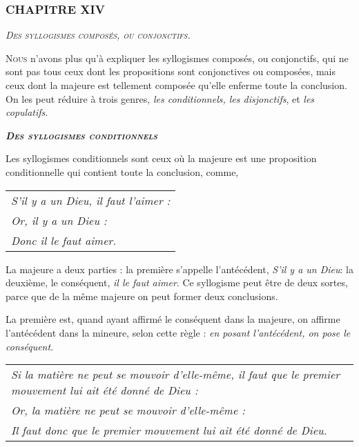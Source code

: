 \subsubsection{\centering \Large CHAPITRE XIV}
\begin{center}\emph{\large\scshape Des syllogismes composés, ou conjonctifs.}\end{center}

	\lettrine{N}{ous} n'avons plus qu'à expliquer les syllogismes composés, ou conjonctifs, qui ne sont pas tous ceux dont les propositions sont conjonctives ou composées, mais ceux dont la majeure est tellement composée qu'elle enferme toute la conclusion. On les peut réduire à trois genres, \emph{les conditionnels, les disjonctifs}, et \emph{les copulatifs}.

\begin{center}\emph{\scshape\bfseries Des syllogismes conditionnels}\end{center}

Les syllogismes conditionnels sont ceux où la majeure est une proposition conditionnelle qui contient toute la conclusion, comme,

	\begin{tabularx}{\textwidth}{X}
		\emph{S'il y a un Dieu, il faut l'aimer :} \\
		\emph{Or, il y a un Dieu :} \\
		\emph{Donc il le faut aimer.} \\
	\end{tabularx}

La majeure a deux parties : la première s'appelle l'antécédent, \emph{S'il y a un Dieu}: la deuxième, le conséquent, \emph{il le faut aimer}. Ce syllogisme peut être de deux sortes, parce que de la même majeure on peut former deux conclusions.

La première est, quand ayant affirmé le conséquent dans la majeure, on affirme l'antécédent dans la mineure, selon cette règle : \emph{en posant l'antécédent, on pose le conséquent}.

	\begin{tabularx}{\textwidth}{X}
		\emph{Si la matière ne peut se mouvoir d'elle-même, il faut que le premier mouvement lui ait été donné de Dieu :} \\
		\emph{Or, la matière ne peut se mouvoir d'elle-même :} \\
		\emph{Il faut donc que le premier mouvement lui ait été donné de Dieu.} \\
	\end{tabularx}

